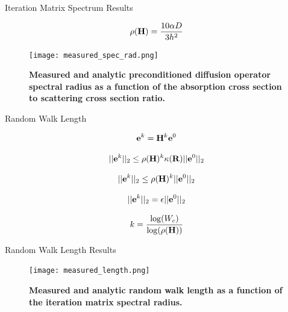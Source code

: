 \documentclass{beamer}
\begin{document}
\begin{frame}{Iteration Matrix Spectrum Results}

\begin{equation}
  \rho(\mathbf{H}) = \frac{10 \alpha D}{3 h^2}
  \label{eq:iteration_radius}
\end{equation}

\begin{figure}[t!]
  \begin{center}
    \texttt{[image: measured\_spec\_rad.png]}
  \end{center}
  \caption{\textbf{Measured and analytic preconditioned diffusion
      operator spectral radius as a function of the absorption cross
      section to scattering cross section ratio.}}
  \label{fig:measured_spec_rad}
\end{figure}

\end{frame}

\begin{frame}{Random Walk Length}

\begin{equation}
  \mathbf{e}^{k} = \mathbf{H}^k\mathbf{e}^0
  \label{eq:linear_k_iter_error}
\end{equation}

\begin{equation}
  ||\mathbf{e}^{k}||_2 \leq \rho(\mathbf{H})^k \kappa(\mathbf{R})
  ||\mathbf{e}^0||_2
  \label{eq:linear_k_iter_norm2}
\end{equation}

\begin{equation}
  ||\mathbf{e}^{k}||_2 \leq \rho(\mathbf{H})^k ||\mathbf{e}^0||_2
  \label{eq:linear_k_iter_norm3}
\end{equation}

\begin{equation}
  ||\mathbf{e}^{k}||_2 = \epsilon ||\mathbf{e}^0||_2
  \label{eq:linear_k_iter_norm4}
\end{equation}

\begin{equation}
  k = \frac{ \log(W_c) }{ \log( \rho(\mathbf{H}) ) }
  \label{eq:analytic_k}
\end{equation}

\end{frame}

\begin{frame}{Random Walk Length Results}

\begin{figure}[t!]
  \begin{center}
    \texttt{[image: measured\_length.png]}
  \end{center}
  \caption{\textbf{Measured and analytic random walk length as a
      function of the iteration matrix spectral radius.}}
  \label{fig:measured_length}
\end{figure}

\end{frame}
\end{document}
